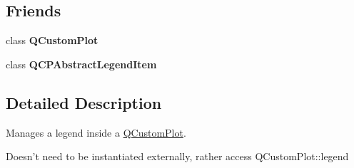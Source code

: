 \subsection*{Friends}
\begin{DoxyCompactItemize}
\item 
\hypertarget{classQCPLegend_a1cdf9df76adcfae45261690aa0ca2198}{class {\bfseries Q\-Custom\-Plot}}\label{classQCPLegend_a1cdf9df76adcfae45261690aa0ca2198}

\item 
\hypertarget{classQCPLegend_a8a375e31e42c68de049fcf0fd35db5b0}{class {\bfseries Q\-C\-P\-Abstract\-Legend\-Item}}\label{classQCPLegend_a8a375e31e42c68de049fcf0fd35db5b0}

\end{DoxyCompactItemize}


\subsection{Detailed Description}
Manages a legend inside a \hyperlink{classQCustomPlot}{Q\-Custom\-Plot}. 

Doesn't need to be instantiated externally, rather access Q\-Custom\-Plot\-::legend 

